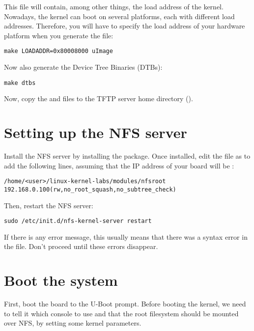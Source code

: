 This file will contain, among other things, the load address of the
kernel. Nowadays, the kernel can boot on several platforms, each with
different load addresses. Therefore, you will have to specify the
load address of your hardware platform when you generate the
 file:

\begin{verbatim}
make LOADADDR=0x80008000 uImage
\end{verbatim}

Now also generate the Device Tree Binaries (DTBs):

\begin{verbatim}
make dtbs
\end{verbatim}

Now, copy the  and  files
to the TFTP server home directory ().

\section{Setting up the NFS server}

Install the NFS server by installing the 
package. Once installed, edit the  file as
 to add the following lines, assuming that the IP address
of your board will be :

\scriptsize
\begin{verbatim}
/home/<user>/linux-kernel-labs/modules/nfsroot 192.168.0.100(rw,no_root_squash,no_subtree_check)
\end{verbatim}
\normalsize

Then, restart the NFS server:

\begin{verbatim}
sudo /etc/init.d/nfs-kernel-server restart
\end{verbatim}

If there is any error message, this usually means that there was a
syntax error in the  file. Don't proceed until these
errors disappear.

\section{Boot the system}

First, boot the board to the U-Boot prompt. Before booting the kernel,
we need to tell it which console to use and that the root filesystem
should be mounted over NFS, by setting some kernel parameters.


